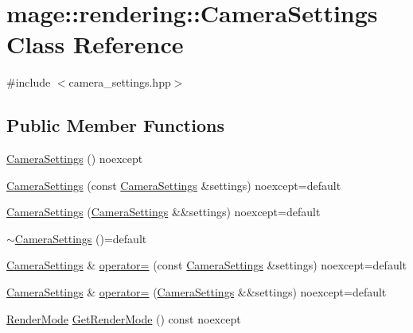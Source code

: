 \hypertarget{classmage_1_1rendering_1_1_camera_settings}{}\section{mage\+:\+:rendering\+:\+:Camera\+Settings Class Reference}
\label{classmage_1_1rendering_1_1_camera_settings}


{\ttfamily \#include $<$camera\+\_\+settings.\+hpp$>$}

\subsection*{Public Member Functions}
\begin{DoxyCompactItemize}
\item 
\hyperlink{classmage_1_1rendering_1_1_camera_settings_a46be4ca54bacf2597672a2e944f9fef6}{Camera\+Settings} () noexcept
\item 
\hyperlink{classmage_1_1rendering_1_1_camera_settings_af0501d9365b74ce296a517b40a13e81e}{Camera\+Settings} (const \hyperlink{classmage_1_1rendering_1_1_camera_settings}{Camera\+Settings} \&settings) noexcept=default
\item 
\hyperlink{classmage_1_1rendering_1_1_camera_settings_a08e6d9c319feb6af0c14f4d057220da8}{Camera\+Settings} (\hyperlink{classmage_1_1rendering_1_1_camera_settings}{Camera\+Settings} \&\&settings) noexcept=default
\item 
\hyperlink{classmage_1_1rendering_1_1_camera_settings_a0e5badc4e959b8ddad0d7df2da4c934f}{$\sim$\+Camera\+Settings} ()=default
\item 
\hyperlink{classmage_1_1rendering_1_1_camera_settings}{Camera\+Settings} \& \hyperlink{classmage_1_1rendering_1_1_camera_settings_a8cc59c883ea4c45a6bb7e9dc728856fd}{operator=} (const \hyperlink{classmage_1_1rendering_1_1_camera_settings}{Camera\+Settings} \&settings) noexcept=default
\item 
\hyperlink{classmage_1_1rendering_1_1_camera_settings}{Camera\+Settings} \& \hyperlink{classmage_1_1rendering_1_1_camera_settings_a28ae670d467adfc74ef8929f24b2e615}{operator=} (\hyperlink{classmage_1_1rendering_1_1_camera_settings}{Camera\+Settings} \&\&settings) noexcept=default
\item 
\hyperlink{namespacemage_1_1rendering_aeb14ce7610cc9391f4e01be027b91dcc}{Render\+Mode} \hyperlink{classmage_1_1rendering_1_1_camera_settings_ab1421b9c47b7eafbebd0619c5b5116b5}{Get\+Render\+Mode} () const noexcept

\end{DoxyCompactItemize}
